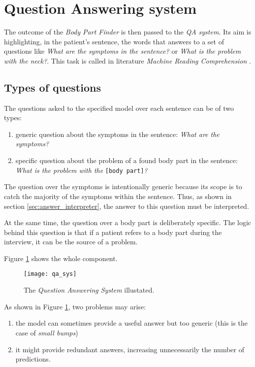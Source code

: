 \section{Question Answering system}
\label{sec:qa_system}
The outcome of the \textit{Body Part Finder} is then passed to the \textit{QA system}. Its aim is highlighting, in the patient's sentence, the words that answers to a set of questions like \textit{What are the symptoms in the sentence?} or \textit{What is the problem with the neck?}. This task is called in literature \textit{Machine Reading Comprehension} \cite{rnet}.

\subsection{Types of questions}
The questions asked to the specified model over each sentence can be of two types:
\begin{enumerate}
  \item generic question about the symptoms in the sentence: \textit{What are the symptoms?}
  \item specific question about the problem of a found body part in the sentence: \textit{What is the problem with the }\texttt{[body part]}\textit{?}
\end{enumerate}

The question over the symptoms is intentionally generic because its scope is to catch the majority of the symptoms within the sentence. Thus, as shown in section \ref{sec:answer_interpreter}, the answer to this question must be interpreted.

At the same time, the question over a body part is deliberately specific. The logic behind this question is that if a patient refers to a body part during the interview, it can be the source of a problem.

Figure \ref{fig:qa} shows the whole component.
\newpage
\begin{figure}[h]
\centering
\texttt{[image: qa\_sys]}
\caption{The \textit{Question Answering System} illustated.}
\medskip
\label{fig:qa}
\end{figure}

As shown in Figure \ref{fig:qa}, two problems may arise: 
\begin{enumerate}
  \item the model can sometimes provide a useful answer but too generic (this is the case of \textit{small bumps})
  \item it might provide redundant answers, increasing unnecessarily the number of predictions.
\end{enumerate}

